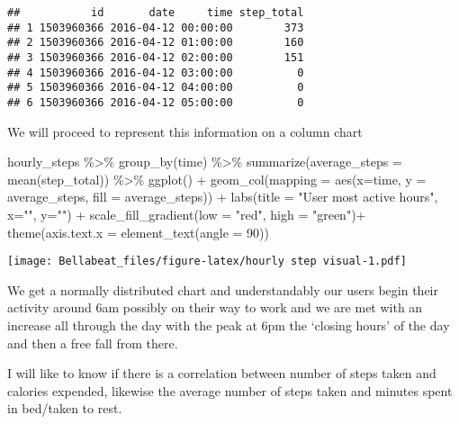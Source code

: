 \documentclass[
]{article}
\newenvironment{Shaded}{\begin{snugshade}}{\end{snugshade}}
\newcommand{\AttributeTok}[1]{\textcolor[rgb]{0.77,0.63,0.00}{#1}}
\newcommand{\DecValTok}[1]{\textcolor[rgb]{0.00,0.00,0.81}{#1}}
\newcommand{\FunctionTok}[1]{\textcolor[rgb]{0.00,0.00,0.00}{#1}}
\newcommand{\NormalTok}[1]{#1}
\newcommand{\SpecialCharTok}[1]{\textcolor[rgb]{0.00,0.00,0.00}{#1}}
\newcommand{\StringTok}[1]{\textcolor[rgb]{0.31,0.60,0.02}{#1}}
\begin{document}
\begin{verbatim}
##           id       date     time step_total
## 1 1503960366 2016-04-12 00:00:00        373
## 2 1503960366 2016-04-12 01:00:00        160
## 3 1503960366 2016-04-12 02:00:00        151
## 4 1503960366 2016-04-12 03:00:00          0
## 5 1503960366 2016-04-12 04:00:00          0
## 6 1503960366 2016-04-12 05:00:00          0
\end{verbatim}

We will proceed to represent this information on a column chart

\begin{Shaded}
\begin{Highlighting}[]
\NormalTok{hourly\_steps }\SpecialCharTok{\%\textgreater{}\%}
  \FunctionTok{group\_by}\NormalTok{(time) }\SpecialCharTok{\%\textgreater{}\%}
  \FunctionTok{summarize}\NormalTok{(}\AttributeTok{average\_steps =} \FunctionTok{mean}\NormalTok{(step\_total)) }\SpecialCharTok{\%\textgreater{}\%}
  \FunctionTok{ggplot}\NormalTok{() }\SpecialCharTok{+}
  \FunctionTok{geom\_col}\NormalTok{(}\AttributeTok{mapping =} \FunctionTok{aes}\NormalTok{(}\AttributeTok{x=}\NormalTok{time, }\AttributeTok{y =}\NormalTok{ average\_steps, }\AttributeTok{fill =}\NormalTok{ average\_steps)) }\SpecialCharTok{+} 
  \FunctionTok{labs}\NormalTok{(}\AttributeTok{title =} \StringTok{"User most active hours"}\NormalTok{, }\AttributeTok{x=}\StringTok{""}\NormalTok{, }\AttributeTok{y=}\StringTok{""}\NormalTok{) }\SpecialCharTok{+} 
  \FunctionTok{scale\_fill\_gradient}\NormalTok{(}\AttributeTok{low =} \StringTok{"red"}\NormalTok{, }\AttributeTok{high =} \StringTok{"green"}\NormalTok{)}\SpecialCharTok{+}
  \FunctionTok{theme}\NormalTok{(}\AttributeTok{axis.text.x =} \FunctionTok{element\_text}\NormalTok{(}\AttributeTok{angle =} \DecValTok{90}\NormalTok{))}
\end{Highlighting}
\end{Shaded}

\texttt{[image: Bellabeat\_files/figure-latex/hourly step visual-1.pdf]}

We get a normally distributed chart and understandably our users begin
their activity around 6am possibly on their way to work and we are met
with an increase all through the day with the peak at 6pm the `closing
hours' of the day and then a free fall from there.

I will like to know if there is a correlation between number of steps
taken and calories expended, likewise the average number of steps taken
and minutes spent in bed/taken to rest.
\end{document}
